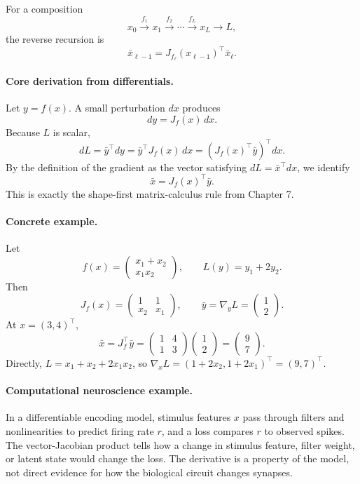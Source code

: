 For a composition
\[
x_0\xrightarrow{f_1}x_1\xrightarrow{f_2}\cdots\xrightarrow{f_L}x_L\xrightarrow{}L,
\]
the reverse recursion is
\[
\boxed{
\bar x_{\ell-1}=J_{f_\ell}(x_{\ell-1})^\top \bar x_\ell.
}
\]

\paragraph{Core derivation from differentials.}
Let \(y=f(x)\). A small perturbation \(dx\) produces
\[
dy=J_f(x)\,dx.
\]
Because \(L\) is scalar,
\[
dL=\bar y^\top dy
=\bar y^\top J_f(x)\,dx
=(J_f(x)^\top\bar y)^\top dx.
\]
By the definition of the gradient as the vector satisfying \(dL=\bar x^\top dx\), we identify
\[
\bar x=J_f(x)^\top\bar y.
\]
This is exactly the shape-first matrix-calculus rule from Chapter 7.

\paragraph{Concrete example.}
Let
\[
f(x)=
\begin{pmatrix}
x_1+x_2\\
x_1x_2
\end{pmatrix},
\qquad
L(y)=y_1+2y_2.
\]
Then
\[
J_f(x)=
\begin{pmatrix}
1&1\\
x_2&x_1
\end{pmatrix},
\qquad
\bar y=\nabla_y L=
\begin{pmatrix}1\\2\end{pmatrix}.
\]
At \(x=(3,4)^\top\),
\[
\bar x=J_f^\top\bar y
=
\begin{pmatrix}
1&4\\
1&3
\end{pmatrix}
\begin{pmatrix}1\\2\end{pmatrix}
=
\begin{pmatrix}9\\7\end{pmatrix}.
\]
Directly, \(L=x_1+x_2+2x_1x_2\), so \(\nabla_xL=(1+2x_2,1+2x_1)^\top=(9,7)^\top\).

\paragraph{Computational neuroscience example.}
In a differentiable encoding model, stimulus features \(x\) pass through filters and nonlinearities to predict firing rate \(r\), and a loss compares \(r\) to observed spikes. The vector-Jacobian product tells how a change in stimulus feature, filter weight, or latent state would change the loss. The derivative is a property of the model, not direct evidence for how the biological circuit changes synapses.

